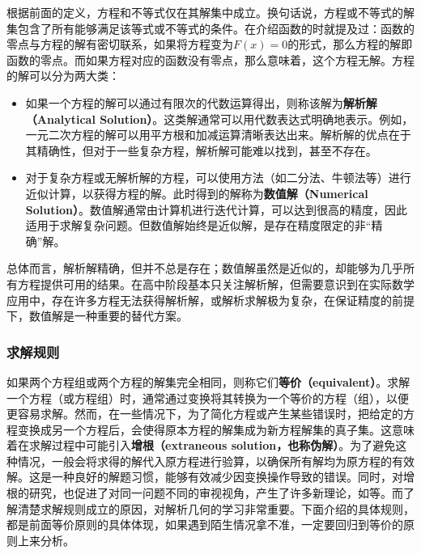 根据前面的定义，方程和不等式仅在其解集中成立。换句话说，方程或不等式的解集包含了所有能够满足该等式或不等式的条件。在介绍函数的时就提及过：函数的零点与方程的解有密切联系，如果将方程变为$F(x)=0$的形式，那么方程的解即函数的零点。而如果方程对应的函数没有零点，那么意味着，这个方程无解。方程的解可以分为两大类：

\begin{itemize}
\item 如果一个方程的解可以通过有限次的代数运算得出，则称该解为\textbf{解析解（Analytical Solution）}。这类解通常可以用代数表达式明确地表示。例如，一元二次方程的解可以用平方根和加减运算清晰表达出来。解析解的优点在于其精确性，但对于一些复杂方程，解析解可能难以找到，甚至不存在。
\item 对于复杂方程或无解析解的方程，可以使用方法（如二分法、牛顿法等）进行近似计算，以获得方程的解。此时得到的解称为\textbf{数值解（Numerical Solution）}。数值解通常由计算机进行迭代计算，可以达到很高的精度，因此适用于求解复杂问题。但数值解始终是近似解，是存在精度限定的非“精确”解。
\end{itemize}

总体而言，解析解精确，但并不总是存在；数值解虽然是近似的，却能够为几乎所有方程提供可用的结果。在高中阶段基本只关注解析解，但需要意识到在实际数学应用中，存在许多方程无法获得解析解，或解析求解极为复杂，在保证精度的前提下，数值解是一种重要的替代方案。

\subsubsection{求解规则}

如果两个方程组或两个方程的解集完全相同，则称它们\textbf{等价（equivalent）}。求解一个方程（或方程组）时，通常通过变换将其转换为一个等价的方程（组），以便更容易求解。然而，在一些情况下，为了简化方程或产生某些错误时，把给定的方程变换成另一个方程后，会使得原本方程的解集成为新方程解集的真子集。这意味着在求解过程中可能引入\textbf{增根（extraneous solution，也称伪解）}。为了避免这种情况，一般会将求得的解代入原方程进行验算，以确保所有解均为原方程的有效解。这是一种良好的解题习惯，能够有效减少因变换操作导致的错误。同时，对增根的研究，也促进了对同一问题不同的审视视角，产生了许多新理论，如等。而了解清楚求解规则成立的原因，对解析几何的学习非常重要。下面介绍的具体规则，都是前面等价原则的具体体现，如果遇到陌生情况拿不准，一定要回归到等价的原则上来分析。

